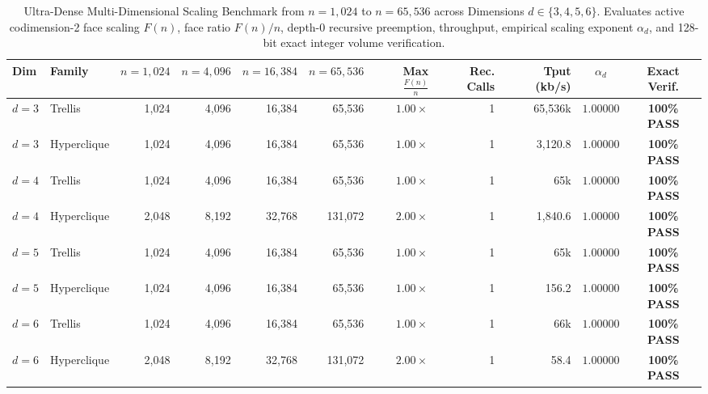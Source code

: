 \begin{table}[t]
\centering
\caption{Ultra-Dense Multi-Dimensional Scaling Benchmark from $n = 1{,}024$ to $n = 65{,}536$ across Dimensions $d \in \{3, 4, 5, 6\}$. Evaluates active codimension-2 face scaling $F(n)$, face ratio $F(n)/n$, depth-0 recursive preemption, throughput, empirical scaling exponent $\alpha_d$, and 128-bit exact integer volume verification.}
\label{tab:ultrascale}
\small
\begin{tabular}{llr rrrrr rcc}
\toprule
\textbf{Dim} & \textbf{Family} & $n = 1{,}024$ & $n = 4{,}096$ & $n = 16{,}384$ & $n = 65{,}536$ & \textbf{Max} $\frac{F(n)}{n}$ & \textbf{Rec. Calls} & \textbf{Tput (kb/s)} & $\alpha_d$ & \textbf{Exact Verif.} \\
\midrule
$d = 3$ & Trellis & 1,024 & 4,096 & 16,384 & 65,536 & $1.00\times$ & 1 & 65,536k & $\mathbf{1.00000}$ & \textbf{100\% PASS} \\
$d = 3$ & Hyperclique & 1,024 & 4,096 & 16,384 & 65,536 & $1.00\times$ & 1 & 3,120.8 & $\mathbf{1.00000}$ & \textbf{100\% PASS} \\
\midrule
$d = 4$ & Trellis & 1,024 & 4,096 & 16,384 & 65,536 & $1.00\times$ & 1 & 65k & $\mathbf{1.00000}$ & \textbf{100\% PASS} \\
$d = 4$ & Hyperclique & 2,048 & 8,192 & 32,768 & 131,072 & $2.00\times$ & 1 & 1,840.6 & $\mathbf{1.00000}$ & \textbf{100\% PASS} \\
\midrule
$d = 5$ & Trellis & 1,024 & 4,096 & 16,384 & 65,536 & $1.00\times$ & 1 & 65k & $\mathbf{1.00000}$ & \textbf{100\% PASS} \\
$d = 5$ & Hyperclique & 1,024 & 4,096 & 16,384 & 65,536 & $1.00\times$ & 1 & 156.2 & $\mathbf{1.00000}$ & \textbf{100\% PASS} \\
\midrule
$d = 6$ & Trellis & 1,024 & 4,096 & 16,384 & 65,536 & $1.00\times$ & 1 & 66k & $\mathbf{1.00000}$ & \textbf{100\% PASS} \\
$d = 6$ & Hyperclique & 2,048 & 8,192 & 32,768 & 131,072 & $2.00\times$ & 1 & 58.4 & $\mathbf{1.00000}$ & \textbf{100\% PASS} \\
\bottomrule
\end{tabular}
\end{table}